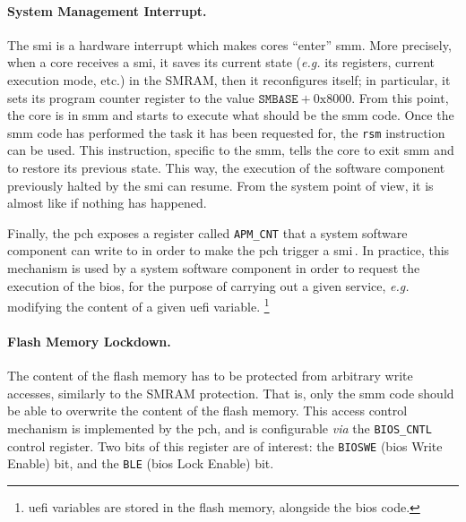 \paragraph{System Management Interrupt.}

The \ac{smi} is a hardware interrupt which makes cores ``enter'' \ac{smm}.
%
More precisely, when a core receives a \ac{smi}, it saves its current state
(\emph{e.g.} its registers, current execution mode, etc.) in the SMRAM, then it
reconfigures itself;
%
in particular, it sets its program counter register to the value
$\mathtt{SMBASE} + \mathrm{0x8000}$.
%
From this point, the core is in \ac{smm} and starts to execute what should be
the \ac{smm} code.
%
Once the \ac{smm} code has performed the task it has been requested for, the
\texttt{rsm} instruction can be used.
%
This instruction, specific to the \ac{smm}, tells the core to exit \ac{smm} and
to restore its previous state.
%
This way, the execution of the software component previously halted by the
\ac{smi} can resume.
%
From the system point of view, it is almost like if nothing has happened.

Finally, the \ac{pch} exposes a register called \texttt{APM\_CNT} that a system
software component can write to in order to make the \ac{pch} trigger a
\ac{smi}\,\cite{intel2012pch}.
%
In practice, this mechanism is used by a system software component in order to
request the execution of the \ac{bios}, for the purpose of carrying out a given
service, \emph{e.g.} modifying the content of a given \ac{uefi} variable.
%
\footnote{\ac{uefi} variables are stored in the flash memory, alongside the
  \ac{bios} code.}

\paragraph{Flash Memory Lockdown.}
%
The content of the flash memory has to be protected from arbitrary write
accesses, similarly to the SMRAM protection.
%
That is, only the \ac{smm} code should be able to overwrite the content of the
flash memory.
%
This access control mechanism is implemented by the \ac{pch}, and is
configurable \emph{via} the \texttt{BIOS\_CNTL} control register.
%
Two bits of this register are of interest: the \texttt{BIOSWE} (\ac{bios} Write
Enable) bit, and the \texttt{BLE} (\ac{bios} Lock Enable) bit.

